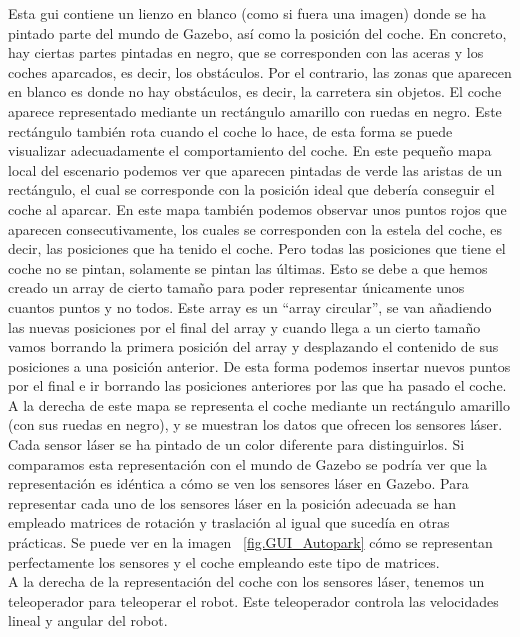 Esta \acrshort{gui} contiene un lienzo en blanco (como si fuera una imagen) donde se ha pintado parte del mundo de Gazebo, así como la posición del coche. En concreto, hay ciertas partes pintadas en negro, que se corresponden con las aceras y los coches aparcados, es decir, los obstáculos. Por el contrario, las zonas que aparecen en blanco es donde no hay obstáculos, es decir, la carretera sin objetos. El coche aparece representado mediante un rectángulo amarillo con ruedas en negro. Este rectángulo también rota cuando el coche lo hace, de esta forma se puede visualizar adecuadamente el comportamiento del coche. En este pequeño mapa local del escenario podemos ver que aparecen pintadas de verde las aristas de un rectángulo, el cual se corresponde con la posición ideal que debería conseguir el coche al aparcar. En este mapa también podemos observar unos puntos rojos que aparecen consecutivamente, los cuales se corresponden con la estela del coche, es decir, las posiciones que ha tenido el coche. Pero todas las posiciones que tiene el coche no se pintan, solamente se pintan las últimas. Esto se debe a que hemos creado un array de cierto tamaño para poder representar únicamente unos cuantos puntos y no todos. Este array es un ``array circular'', se van añadiendo las nuevas posiciones por el final del array y cuando llega a un cierto tamaño vamos borrando la primera posición del array y desplazando el contenido de sus posiciones a una posición anterior. De esta forma podemos insertar nuevos puntos por el final e ir borrando las posiciones anteriores por las que ha pasado el coche.\\

A la derecha de este mapa se representa el coche mediante un rectángulo amarillo (con sus ruedas en negro), y se muestran los datos que ofrecen los sensores láser. Cada sensor láser se ha pintado de un color diferente para distinguirlos. Si comparamos esta representación con el mundo de Gazebo se podría ver que la representación es idéntica a cómo se ven los sensores láser en Gazebo. Para representar cada uno de los sensores láser en la posición adecuada se han empleado matrices de rotación y traslación al igual que sucedía en otras prácticas. Se puede ver en la imagen ~\ref{fig.GUI_Autopark} cómo se representan perfectamente los sensores y el coche empleando este tipo de matrices. \\

A la derecha de la representación del coche con los sensores láser, tenemos un teleoperador para teleoperar el robot. Este teleoperador controla las velocidades lineal y angular del robot. \\

